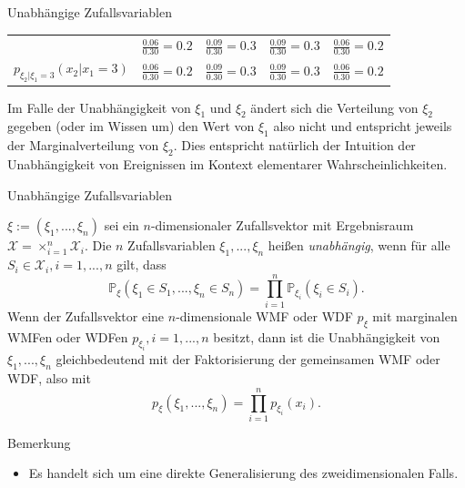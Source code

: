 \documentclass[
  8pt,
  ignorenonframetext,
]{beamer}
\providecommand{\tightlist}{%
  \setlength{\itemsep}{0pt}\setlength{\parskip}{0pt}}
\begin{document}
\begin{frame}{Unabhängige Zufallsvariablen}
\begin{center}
\begin{tabular}{|c|cccc|}
&   $\frac{0.06}{0.30} = 0.2$

&   $\frac{0.09}{0.30} = 0.3$

&   $\frac{0.09}{0.30} = 0.3$

&   $\frac{0.06}{0.30} = 0.2$
\\
$p_{\xi_2|\xi_1 = 3}(x_2|x_1 = 3)$
%
&   $\frac{0.06}{0.30} = 0.2$
%
&   $\frac{0.09}{0.30} = 0.3$
%
&   $\frac{0.09}{0.30} = 0.3$
%
&   $\frac{0.06}{0.30} = 0.2$
\\\hline
\end{tabular}
\end{center}
\vspace{2mm}

Im Falle der Unabhängigkeit von \(\xi_1\) und \(\xi_2\) ändert sich die
Verteilung von \(\xi_2\) gegeben (oder im Wissen um) den Wert von
\(\xi_1\) also nicht und entspricht jeweils der Marginalverteilung von
\(\xi_2\). Dies entspricht natürlich der Intuition der Unabhängigkeit
von Ereignissen im Kontext elementarer Wahrscheinlichkeiten.
\end{frame}

\begin{frame}{Unabhängige Zufallsvariablen}
\protect\hypertarget{unabhuxe4ngige-zufallsvariablen-4}{}
\small
\begin{definition}
\justifying
$\xi:= (\xi_1,...,\xi_n)$ sei ein $n$-dimensionaler Zufallsvektor mit Ergebnisraum 
$\mathcal{X}  = \times_{i=1}^n \mathcal{X}_i$. Die $n$ Zufallsvariablen $\xi_1,...,\xi_n$ 
heißen \textit{unabhängig}, wenn für alle $S_i \in \mathcal{X}_i, i = 1,...,n$ gilt, dass
\begin{equation}
\mathbb{P}_\xi(\xi_1 \in S_1, ...,\xi_n \in S_n) = \prod_{i=1}^n \mathbb{P}_{\xi_i}(\xi_i \in S_i).
\end{equation}
Wenn der Zufallsvektor eine $n$-dimensionale WMF oder WDF $p_\xi$ mit marginalen
WMFen oder WDFen $p_{\xi_i}, i = 1,...,n$ besitzt, dann ist die Unabhängigkeit von 
$\xi_1,...,\xi_n$ gleichbedeutend mit der Faktorisierung der gemeinsamen WMF oder WDF, also mit
\begin{equation}
p_\xi(\xi_1,...,\xi_n) = \prod_{i=1}^n p_{\xi_i}(x_i).
\end{equation}
\end{definition}

Bemerkung

\begin{itemize}
\tightlist
\item
  Es handelt sich um eine direkte Generalisierung des zweidimensionalen
  Falls.
\end{itemize}
\end{frame}
\end{document}
